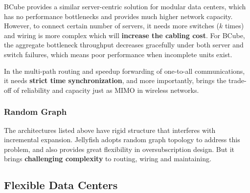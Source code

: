 \documentclass[journal,onecolumn,11pt]{IEEEtran}
\begin{document}
%
%

BCube provides a similar server-centric solution for modular data centers, which has no performance bottlenecks and provides much higher network capacity. However, to connect certain number of servers, it needs more switches ($k$ times) and wiring is more complex which will \textbf{increase the cabling cost}. For BCube, the aggregate bottleneck throughput decreases gracefully under both server and switch failures, which means poor performance when incomplete units exist.

In the multi-path routing and speedup forwarding of one-to-all communications, it needs \textbf{strict time synchronization}, and more importantly, brings the trade-off of reliability and capacity just as MIMO in wireless networks.

%
%

\subsubsection{Random Graph}

The architectures listed above have rigid structure that interferes with incremental expansion. Jellyfish adopts random graph topology to address this problem, and also provides great flexibility in oversubscription design. But it brings \textbf{challenging complexity} to routing, wiring and maintaining.

\subsection{Flexible Data Centers}
\end{document}
